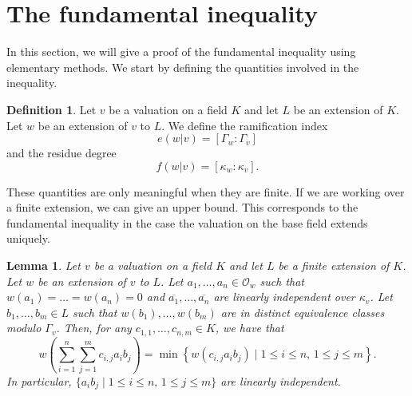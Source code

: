 \documentclass[12pt,a4paper]{amsart}
\newtheorem{lem}[thm]{Lemma}
\theoremstyle{definition}
\newtheorem{de}[thm]{Definition}
\begin{document}
\section{The fundamental inequality}
In this section, we will give a proof of the fundamental inequality using elementary methods.
We start by defining the quantities involved in the inequality.
\begin{de}
Let $v$ be a valuation on a field $K$ and let $L$ be an extension of $K$.
Let $w$ be an extension of $v$ to $L$.
We define the ramification index
$$e(w|v)=[\Gamma_w:\Gamma_v]$$
and the residue degree
$$f(w|v)=[\kappa_w:\kappa_v].$$
\end{de}
These quantities are only meaningful when they are finite.
If we are working over a finite extension, we can give an upper bound.
This corresponds to the fundamental inequality in the case the valuation on the base field extends uniquely.
\begin{lem}{\label{ef}}
Let $v$ be a valuation on a field $K$ and let $L$ be a finite extension of $K$.
Let $w$ be an extension of $v$ to $L$.
Let $a_1,\ldots,a_n\in \mathcal{O}_w$ such that $w(a_1)=\ldots=w(a_n)=0$ and $\overline{a_1},\ldots,\overline{a_n}$ are linearly independent over $\kappa_v$.
Let $b_1,\ldots,b_m\in L$ such that $w(b_1),\ldots,w(b_m)$ are in distinct equivalence classes modulo $\Gamma_v$.
Then, for any $c_{1,1},\ldots,c_{n,m}\in K$, we have that
$$w\left(\sum_{i=1}^n\sum_{j=1}^mc_{i,j}a_ib_j\right)=\min\left\{w(c_{i,j}a_ib_j)\mid 1\leq i\leq n,\, 1\leq j\leq m\right\}.$$
In particular, $\{a_ib_j\mid 1\leq i\leq n,\, 1\leq j\leq m\}$ are linearly independent.
\end{lem}
\end{document}
